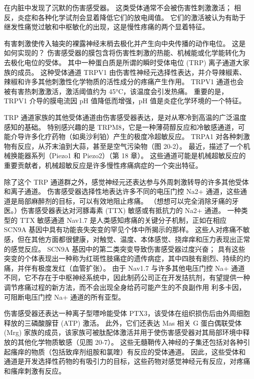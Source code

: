 在内脏中发现了沉默的伤害感受器。 这类受体通常不会被伤害性刺激激活； 相反，炎症和各种化学试剂会显着降低它们的放电阈值。 它们的激活被认为有助于继发性痛觉过敏和中枢敏化的出现，这是慢性疼痛的两个显着特征。

有害刺激使传入轴突的裸露神经末梢去极化并产生向中央传播的动作电位。 这是如何实现的？ 伤害感受器的膜包含将伤害性刺激的热能、机械能或化学能转化为去极化电位的受体。 其中一种蛋白质是所谓的瞬时受体电位 (TRP) 离子通道大家族的成员。 这种受体通道 TRPV1 由伤害性神经元选择性表达，并介导辣椒素、辣椒和许多其他刺激性化学物质的活性成分的疼痛产生作用。 TRPV1 通道也会被有害热刺激激活，激活阈值约为 45°C，该温度会引发热痛。 重要的是，TRPV1 介导的膜电流因 pH 值降低而增强，pH 值是炎症化学环境的一个特征。

TRP 通道家族的其他受体通道由伤害感受器表达，是对从寒冷到高温的广泛温度感知的基础。 特别感兴趣的是 TRPM8，它是一种薄荷醇反应和冷敏感通道，可能介导许多化疗药物（如奥沙利铂）产生的极度冷超敏反应。 TRPA1 对各种刺激物有反应，从芥末油到大蒜，甚至是空气污染物（图 20-2）。 最近，描述了一个机械换能器系列（Piezo1 和 Piezo2）（第 18 章）。 这些通道可能是机械超敏反应的重要贡献者，机械超敏反应是许多慢性疼痛病症的一个突出特征。

除了这个 TRP 通道群之外，感觉神经元还表达参与外周刺激转导的许多其他受体和离子通道。 伤害感受器选择性地表达许多不同的电压门控 Na2+ 通道，这些通道是局部麻醉剂的目标，可以有效地阻止疼痛。 （想想可以完全消除牙痛的牙医。）伤害感受器表达对河豚毒素 (TTX) 敏感或有抵抗力的 Na2+ 通道。 一种类型的 TTX 敏感通道 Nav1.7 是人类感知疼痛的关键分子机制，正如在相应 SCN9A 基因中具有功能丧失突变的罕见个体中所揭示的那样。 这些人对疼痛不敏感，但在其他方面都很健康，对触觉、温度、本体感觉、挠痒痒和压力表现出正常的感觉反应。 SCN9A 基因中的第二类突变导致伤害感受器过度兴奋； 具有这些突变的个体表现出一种称为红斑性肢痛症的遗传病症，其中四肢有剧烈、持续的灼痛，并伴有极度发红（血管扩张）。 由于 Nav1.7 与许多其他电压门控 Na+ 通道不同，它不存在于中枢神经系统中，因此制药公司正在开发拮抗剂，有望提供一种调节疼痛过程的新方法，而不会出现全身给药可能产生的不良副作用 利多卡因，可阻断电压门控 Na+ 通道的所有亚型。

伤害感受器还表达一种离子型嘌呤能受体 PTX3，该受体在组织损伤后由外周细胞释放的三磷酸腺苷 (ATP) 激活。 此外，它们还表达 Mas 相关 G 蛋白偶联受体 (Mrg) 家族的成员，该家族可被肽配体激活并用于使伤害感受器对其局部环境中释放的其他化学物质敏感（见图 20-7）。 这些无髓鞘传入神经的子集还包括对各种引起瘙痒的物质（包括致痒剂组胺和氯喹）有反应的受体通道。 因此，这些受体和通道是开发选择性药物的有吸引力的目标，这些药物对感觉神经元有反应，对疼痛和瘙痒刺激有反应。

